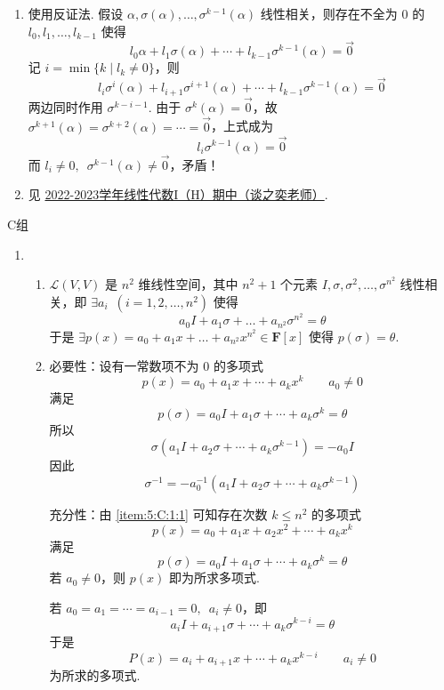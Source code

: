 \begin{enumerate}
    \item 使用反证法. 假设 $ \alpha, \sigma(\alpha), \ldots, \sigma^{k - 1}(\alpha) $ 线性相关，则存在不全为 0 的 $ l_0, l_1, \ldots, l_{k - 1} $ 使得
          \[ l_0 \alpha + l_1 \sigma(\alpha) + \cdots + l_{k - 1} \sigma^{k - 1}(\alpha) = \vec{0} \]
          记 $ i = \min\{k \mid l_k \neq 0\} $，则
          \[ l_i \sigma^{i}(\alpha) + l_{i + 1} \sigma^{i + 1}(\alpha) + \cdots + l_{k - 1} \sigma^{k - 1}(\alpha) = \vec{0} \]
          两边同时作用 $ \sigma^{k - i - 1} $. 由于 $ \sigma^{k}(\alpha) = \vec{0} $，故 $ \sigma^{k + 1}(\alpha) = \sigma^{k + 2}(\alpha) = \cdots = \vec{0} $，上式成为
          \[ l_i \sigma^{k - 1}(\alpha) = \vec{0} \]
          而 $ l_i \neq 0,\enspace \sigma^{k - 1}(\alpha) \neq \vec{0} $，矛盾！

    \item 见 \hyperref[sec:2022-2023-1midtzy]{2022-2023学年线性代数I（H）期中（谈之奕老师）}.
\end{enumerate}

\centerline{\heiti C组}
\begin{enumerate}
    \item \begin{enumerate}
              \item \label{item:5:C:1:1}
                    $ \mathcal{L}(V, V) $ 是 $ n^2 $ 维线性空间，其中 $ n^2 + 1 $ 个元素 $ I, \sigma, \sigma^2, \ldots, \sigma^{n^2} $ 线性相关，即 $ \exists a_i\enspace (i = 1, 2, \ldots, n^2) $ 使得
                    \[ a_0 I + a_1 \sigma + \ldots + a_{n^2} \sigma^{n^2} = \theta \]
                    于是 $ \exists p(x) = a_0 + a_1 x + \ldots + a_{n^2} x^{n^2} \in \mathbf{F}[x] $ 使得 $ p(\sigma) = \theta $.

              \item 必要性：设有一常数项不为 0 的多项式
                    \[ p(x) = a_0 + a_1 x + \cdots + a_k x^k \qquad a_0 \neq 0 \]
                    满足
                    \[ p(\sigma) = a_0 I + a_1 \sigma + \cdots + a_k \sigma^k = \theta \]
                    所以
                    \[ \sigma(a_1 I + a_2 \sigma + \cdots + a_k \sigma^{k - 1}) = -a_0 I \]
                    因此
                    \[ \sigma^{-1} = -a_0^{-1} (a_1 I + a_2 \sigma + \cdots + a_k \sigma^{k - 1}) \]

                    充分性：由 \ref*{item:5:C:1:1} 可知存在次数 $ k \leqslant n^2 $ 的多项式
                    \[ p(x) = a_0 + a_1 x + a_2 x^2 + \cdots + a_k x^k \]
                    满足
                    \[ p(\sigma) = a_0 I + a_1 \sigma + \cdots + a_k \sigma^k = \theta \]
                    若 $ a_0 \neq 0 $，则 $ p(x) $ 即为所求多项式.

                    若 $ a_0 = a_1 = \cdots = a_{i - 1} = 0,\enspace a_i \neq 0 $，即
                    \[ a_i I + a_{i + 1} \sigma + \cdots + a_k \sigma^{k - i} = \theta \]
                    于是
                    \[ P(x) = a_i + a_{i + 1} x + \cdots + a_k x^{k - i} \qquad a_i \neq 0 \]
                    为所求的多项式.
          \end{enumerate}
\end{enumerate}

\clearpage
